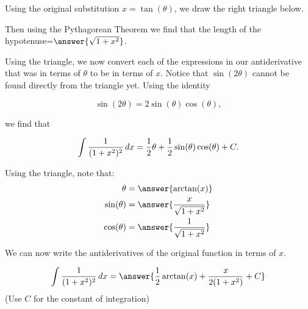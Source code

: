 \documentclass{ximera}
\begin{document}
\begin{exercise}
\begin{exercise}
\begin{exercise}
Using the original substitution $x=\tan(\theta)$, we draw the right triangle below.

    \begin{image}
    \end{image}

Then using the Pythagorean Theorem we find that the
 length of the hypotenuse=$\answer{\sqrt{1+x^2}}$. 

Using the triangle, we now convert each of the expressions in our antiderivative that was in terms of $\theta$ to be in terms of $x$.  Notice that $\sin(2 \theta)$ cannot be found directly from the triangle yet.  Using the identity

\[
\sin(2\theta)=2\sin(\theta)\cos(\theta),
\]

we find that 

\[ \int \frac{1}{ (1+x^2)^2} \mathop{}\!d x = \frac{1}{2}\theta + \frac{1}{2} \sin(\theta) \cos(\theta) + C.\]  

Using the triangle, note that: 
\begin{align}
\theta&=\answer{\arctan(x)} \\
\sin(\theta)&=\answer{\frac{x}{\sqrt{1+x^{2}}}} \\
 \cos(\theta)&=\answer{\frac{1}{\sqrt{1+x^{2}}}} 
\end{align}

We can now write the antiderivatives of the original function in terms of $x$.

\[
\int \frac{1}{ (1+x^2)^2} \d x= \answer{ \frac{1}{2}\arctan(x) + \frac{x}{2(1+x^{2})} + C }
\]
(Use $C$ for the constant of integration)

\end{exercise}

\end{exercise}

\end{exercise}
\end{document}
